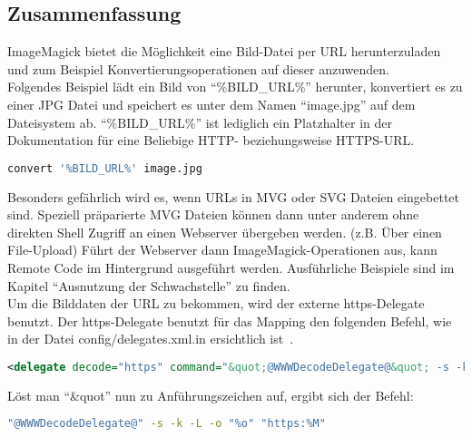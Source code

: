 \subsection{Zusammenfassung}\label{subsec:zusammenfassung}

ImageMagick bietet die Möglichkeit eine Bild-Datei per URL herunterzuladen und zum Beispiel Konvertierungsoperationen auf
dieser anzuwenden.\\

Folgendes Beispiel lädt ein Bild von "`\%BILD\_URL\%"' herunter,
konvertiert es zu einer JPG Datei und speichert es unter dem Namen "`image.jpg"' auf dem Dateisystem ab.
"`\%BILD\_URL\%"' ist lediglich ein Platzhalter in der Dokumentation für eine Beliebige HTTP- beziehungsweise HTTPS-URL.

\begin{lstlisting}[language=Bash, caption=Beispielbefehl Codeablauf,label={lst:codeablaufbeispiel}]
convert '%BILD_URL%' image.jpg
\end{lstlisting}
\vspace{5mm}

Besonders gefährlich wird es, wenn URLs in MVG oder SVG Dateien eingebettet sind.
Speziell präparierte MVG Dateien können dann unter anderem ohne direkten Shell Zugriff an einen Webserver übergeben werden.
(z.B. Über einen File-Upload)
Führt der Webserver dann ImageMagick-Operationen aus, kann Remote Code im Hintergrund ausgeführt werden.
Ausführliche Beispiele sind im Kapitel "`Ausnutzung der Schwachstelle"' zu finden.\\

Um die Bilddaten der URL zu bekommen, wird der externe https-Delegate benutzt.
Der https-Delegate benutzt für das Mapping den folgenden Befehl,
wie in der Datei config/delegates.xml.in ersichtlich ist~\cite{DelegatesXml}.

\begin{lstlisting}[firstnumber=90, language=XML, caption=config/delegates.xml.in https-Delegate,label={lst:lstlisting}]
  <delegate decode="https" command="&quot;@WWWDecodeDelegate@&quot; -s -k -L -o &quot;%o&quot; &quot;https:%M&quot;"/>
\end{lstlisting}
\vspace{5mm}

Löst man "`\&quot"' nun zu Anführungszeichen auf, ergibt sich der Befehl:
\begin{lstlisting}[firstnumber=1, language=Bash, caption=Aufgelöster https-Delegate-Befehl,label={lst:lstlisting}]
"@WWWDecodeDelegate@" -s -k -L -o "%o" "https:%M"
\end{lstlisting}
\vspace{5mm}

